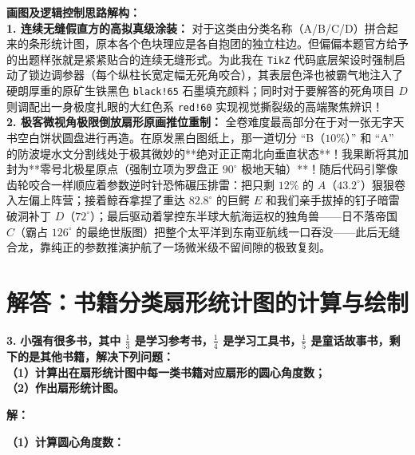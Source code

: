 \vspace{0.6cm}

{\small\color{blue!70!black}
\textbf{画图及逻辑控制思路解构：}\\
\textbf{1. 连续无缝假直方的高拟真级涂装：} 对于这类由分类名称（A/B/C/D）拼合起来的条形统计图，原本各个色块理应是各自抱团的独立柱边。但偏偏本题官方给予的出题样张就是紧紧贴合的连续无缝形式。为此我在 \texttt{TikZ} 代码底层架设时强制启动了锁边调参器（每个纵柱长宽定幅无死角咬合），其表层色泽也被霸气地注入了硬朗厚重的原矿生铁黑色 \texttt{black!65} 石墨填充颜料；同时对于要解答的死角项目 $D$ 则调配出一身极度扎眼的大红色系 \texttt{red!60} 实现视觉撕裂级的高端聚焦辨识！\\
\textbf{2. 极客微视角极限倒放扇形原画推位重制：} 全卷难度最高部分在于对一张无字天书空白饼状圆盘进行再造。在原发黑白图纸上，那一道切分 “B（$10\%$）” 和 “A” 的防波堤水文分割线处于极其微妙的**绝对正正南北向垂直状态**！我果断将其加封为**零号北极星原点（强制立项为罗盘正 $90^\circ$ 极地天轴）**！随后代码引擎像齿轮咬合一样顺应着参数逆时针恐怖碾压排雷：把只剩 $12\%$ 的 $A$（$43.2^\circ$）狠狠卷入左偏上阵营；接着鲸吞拿捏了重达 $82.8^\circ$ 的巨鳄 $E$ 和我们亲手拔掉的钉子暗雷破洞补丁 $D$（$72^\circ$）；最后驱动着掌控东半球大航海运权的独角兽——日不落帝国 $C$（霸占 $126^\circ$ 的最绝世版图）把整个太平洋到东南亚航线一口吞没——此后无缝合龙，靠纯正的参数推演护航了一场微米级不留间隙的极致复刻。
}

\newpage



\section{解答：书籍分类扇形统计图的计算与绘制}

\vspace{0.6cm}

\textbf{\LARGE 3.} \textbf{小强有很多书，其中 $\frac{1}{3}$ 是学习参考书，$\frac{1}{4}$ 是学习工具书，$\frac{1}{5}$ 是童话故事书，剩下的是其他书籍，解决下列问题：\\
（1）计算出在扇形统计图中每一类书籍对应扇形的圆心角度数；\\
（2）作出扇形统计图。}

\vspace{0.4cm}
\textbf{解：}

\textbf{（1）计算圆心角度数：}

